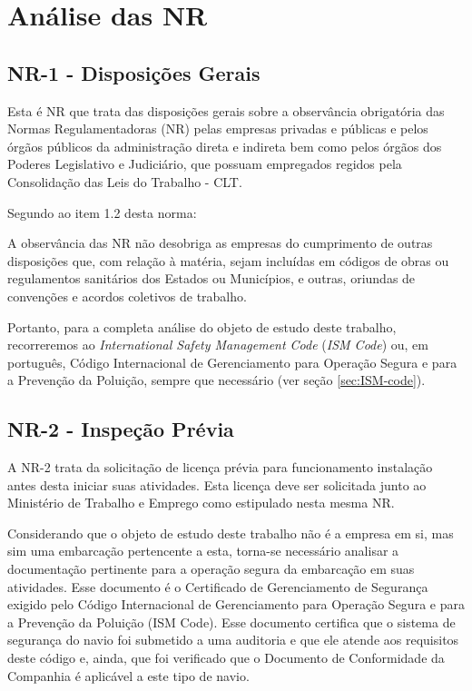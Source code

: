 \documentclass[../main.tex]{subfiles}
\begin{document}
\chapter{Análise das NR}
\section{NR-1 - Disposições Gerais}
Esta é NR que trata das disposições gerais sobre a observância obrigatória das Normas Regulamentadoras (NR) pelas empresas privadas e públicas e pelos órgãos públicos da administração direta e indireta bem como pelos órgãos dos Poderes Legislativo e Judiciário, que possuam empregados regidos pela Consolidação das Leis do Trabalho - CLT.

Segundo ao item 1.2 desta norma:

\begin{citacao}
A observância das NR não desobriga as empresas do cumprimento de outras disposições que, com relação à matéria, sejam incluídas em códigos de obras ou regulamentos sanitários dos Estados ou Municípios, e outras, oriundas de convenções e acordos coletivos de trabalho.
\end{citacao}

Portanto, para a completa análise do objeto de estudo deste trabalho, recorreremos ao \emph{International Safety Management Code} (\emph{ISM Code}) ou, em português, Código Internacional de Gerenciamento para Operação Segura e para a Prevenção da Poluição, sempre que necessário (ver seção \ref{sec:ISM-code}).

\section{NR-2 - Inspeção Prévia}
A NR-2 trata da solicitação de licença prévia para funcionamento instalação antes desta iniciar suas atividades. Esta licença deve ser solicitada junto ao Ministério de Trabalho e Emprego como estipulado nesta mesma NR.

Considerando que o objeto de estudo deste trabalho não é a empresa em si, mas sim uma embarcação pertencente a esta, torna-se necessário analisar a documentação pertinente para a operação segura da embarcação em suas atividades. Esse documento é o Certificado de Gerenciamento de Segurança exigido pelo Código Internacional de Gerenciamento para Operação Segura e para a Prevenção da Poluição (ISM Code). Esse documento certifica que o sistema de segurança do navio foi submetido a uma auditoria e que ele atende aos requisitos deste código e, ainda, que foi verificado que o Documento de Conformidade da Companhia é aplicável a este tipo de navio.
\end{document}
